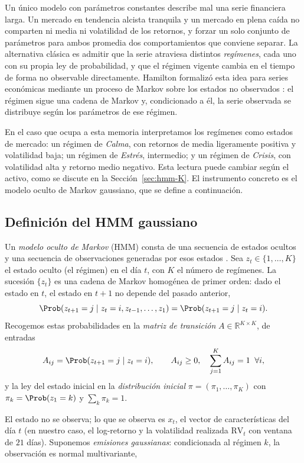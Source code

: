 Un único modelo con parámetros constantes describe mal una serie financiera larga. Un mercado en tendencia alcista tranquila y un mercado en plena caída no comparten ni media ni volatilidad de los retornos, y forzar un solo conjunto de parámetros para ambos promedia dos comportamientos que conviene separar. La alternativa clásica es admitir que la serie atraviesa distintos \emph{regímenes}, cada uno con su propia ley de probabilidad, y que el régimen vigente cambia en el tiempo de forma no observable directamente. Hamilton formalizó esta idea para series económicas mediante un proceso de Markov sobre los estados no observados \cite{hamilton1989}: el régimen sigue una cadena de Markov y, condicionado a él, la serie observada se distribuye según los parámetros de ese régimen.

En el caso que ocupa a esta memoria interpretamos los regímenes como estados de mercado: un régimen de \emph{Calma}, con retornos de media ligeramente positiva y volatilidad baja; un régimen de \emph{Estrés}, intermedio; y un régimen de \emph{Crisis}, con volatilidad alta y retorno medio negativo. Esta lectura puede cambiar según el activo, como se discute en la Sección~\ref{sec:hmm-K}. El instrumento concreto es el modelo oculto de Markov gaussiano, que se define a continuación.

\subsection{Definición del HMM gaussiano}
\label{sec:hmm-def}

Un \emph{modelo oculto de Markov} (HMM) consta de una secuencia de estados ocultos y una secuencia de observaciones generadas por esos estados \cite{rabiner1989, cappe2005}. Sea $z_t \in \{1, \dots, K\}$ el estado oculto (el régimen) en el día $t$, con $K$ el número de regímenes. La sucesión $\{z_t\}$ es una cadena de Markov homogénea de primer orden: dado el estado en $t$, el estado en $t+1$ no depende del pasado anterior,
\[
\Prob(z_{t+1} = j \mid z_t = i, z_{t-1}, \dots, z_1) = \Prob(z_{t+1} = j \mid z_t = i).
\]
Recogemos estas probabilidades en la \emph{matriz de transición} $A \in \mathbb{R}^{K \times K}$, de entradas
\[
A_{ij} = \Prob(z_{t+1} = j \mid z_t = i), \qquad A_{ij} \ge 0, \quad \sum_{j=1}^{K} A_{ij} = 1 \;\;\forall i,
\]
y la ley del estado inicial en la \emph{distribución inicial} $\pi = (\pi_1, \dots, \pi_K)$ con $\pi_k = \Prob(z_1 = k)$ y $\sum_k \pi_k = 1$.

El estado no se observa; lo que se observa es $x_t$, el vector de características del día $t$ (en nuestro caso, el log-retorno y la volatilidad realizada $\mathrm{RV}_t$ con ventana de $21$ días). Suponemos \emph{emisiones gaussianas}: condicionada al régimen $k$, la observación es normal multivariante,

